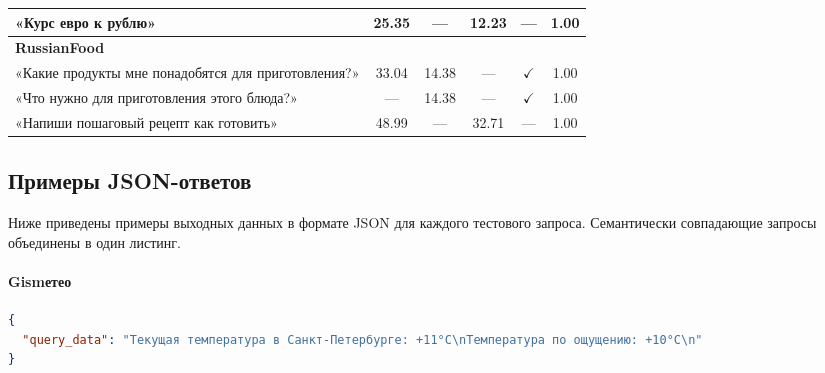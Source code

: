 \begin{sidewaystable}
\begin{tabular}{p{5cm} c c c c c}
        «Курс евро к рублю»                                & 25.35  & —     & 12.23& —              & 1.00 \\
        \midrule
        \textbf{RussianFood} & & & & & \\
        «Какие продукты мне понадобятся для приготовления?» & 33.04  & 14.38 & —    & $\checkmark$             & 1.00 \\
        «Что нужно для приготовления этого блюда?»         & —      & 14.38 & —    & $\checkmark$   & 1.00 \\
        «Напиши пошаговый рецепт как готовить»             & 48.99  & —     & 32.71& —              & 1.00 \\
        \bottomrule
    \end{tabular}
    \label{tab:times}
\end{sidewaystable}

\subsection{Примеры JSON-ответов}

Ниже приведены примеры выходных данных в формате JSON для каждого тестового запроса. Семантически совпадающие запросы объединены в один листинг.


\paragraph{Gismетео}
\begin{lstlisting}[language=json,breaklines, keepspaces=true]
{
  "query_data": "Текущая температура в Санкт-Петербурге: +11°C\nТемпература по ощущению: +10°C\n"
}
\end{lstlisting}



